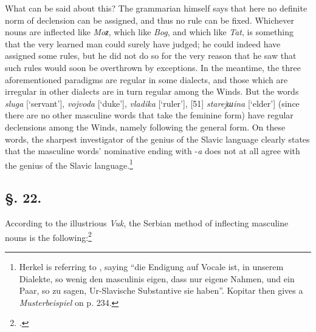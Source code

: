 What can be said about this? The grammarian himself says that here no definite norm of declension can be assigned, and thus no rule can be fixed. Whichever nouns are inflected like \textit{Moƶ}, which like \textit{Bog}, and which like \textit{Tat}, is something that the very learned man could surely have judged; he could indeed have assigned some rules, but he did not do so for the very reason that he saw that such rules would soon be overthrown by exceptions. In the meantime, the three aforementioned paradigms are regular in some dialects, and those which are irregular in other dialects are in turn regular among the Winds. But the words \textit{sluga} [‘servant’], \textit{vojvoda} [‘duke’], \textit{vladika} [‘ruler’], [51] \textit{starejшina} [‘elder’] (since there are no other masculine words that take the feminine form) have regular declensions among the Winds, namely following the general form. On these words, the sharpest investigator of the genius of the Slavic language clearly states that the masculine words’ nominative ending with -\textit{a} does not at all agree with the genius of the Slavic language.\footnote{Herkel is referring to \citet[233]{kopitar_grammatik_1808}, saying “die Endigung auf Vocale ist, in unserem Dialekte, so wenig den masculinis eigen, dass nur eigene Nahmen, und ein Paar, so zu sagen, Ur-Slavische Substantive sie haben”. Kopitar then gives a \textit{Musterbeispiel} on p. 234.}

\subsection*{\hspace*{\fill}§. 22.\hspace*{\fill}}

According to the illustrious \textit{Vuk}, the Serbian method of inflecting masculine nouns is the following:\footnote{\citet[xxxvii]{karadzic_srpski_1818}.}

\newpage

